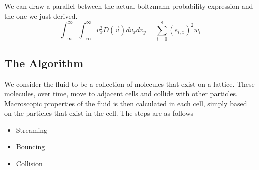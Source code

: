 \documentclass[12pt]{article}
\begin{document}
We can draw a parallel between the actual boltzmann probability expression and the one we just derived. 
\begin{equation}
    \int_{- \infty}^{\infty} \int_{- \infty}^{\infty} v^{2}_{x} D(\vec{v}) dv_{x} dv_{y} = \sum^{8}_{i=0} (e_{i,x})^{2} w_{i}
\end{equation}
\subsection{The Algorithm}
We consider the fluid to be a collection of molecules that exist on a lattice. These molecules, over time, move to adjacent cells and collide with other particles. Macroscopic properties of the fluid is then calculated in each cell, simply based on the particles that exist in the cell. The steps are as follows
\begin{itemize}
    \item Streaming
    \item Bouncing
    \item Collision
\end{itemize}
\end{document}
